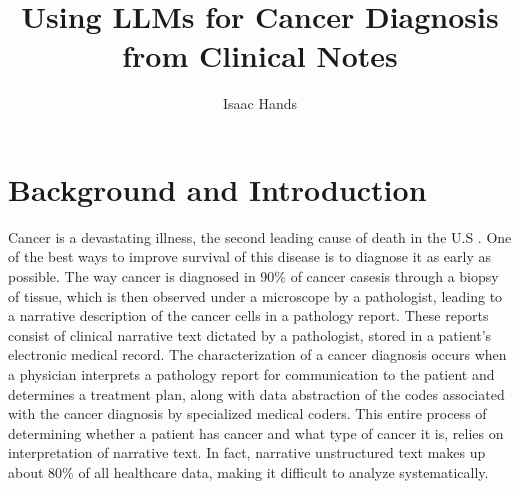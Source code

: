 \documentclass[manuscript,screen,review,nonacm]{acmart}
\begin{document}
\title{Using LLMs for Cancer Diagnosis from Clinical Notes}

\author{Isaac Hands}

\maketitle

\section{Background and Introduction}
Cancer is a devastating illness, the second leading cause of death in the U.S \cite{cdc1}. One of the best ways to improve survival of this disease is to diagnose it as early as possible\cite{cruk1}. The way cancer is diagnosed in 90\% of cancer cases\cite{cdc2}is through a biopsy of tissue, which is then observed under a microscope by a pathologist, leading to a narrative description of the cancer cells in a pathology report. These reports consist of clinical narrative text dictated by a pathologist, stored in a patient's electronic medical record. The characterization of a cancer diagnosis occurs when a physician interprets a pathology report for communication to the patient and determines a treatment plan, along with data abstraction of the codes associated with the cancer diagnosis by specialized medical coders. This entire process of determining whether a patient has cancer and what type of cancer it is, relies on interpretation of narrative text. In fact, narrative unstructured text makes up about 80\% of all healthcare data\cite{Kong:2019tl}, making it difficult to analyze systematically. 
\end{document}
